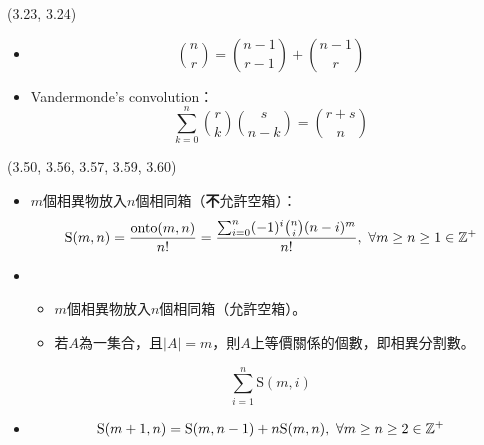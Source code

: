 \item \begin{theorem}{(3.23, 3.24)} \quad\quad
    \begin{itemize}
        \item \begin{equation}
            \binom{n}{r}  = \binom{n - 1}{r - 1} + \binom{n - 1}{r}   
        \end{equation}
        \item Vandermonde's convolution：
        \begin{equation}
            \sum_{k = 0}^{n}\binom{r}{k}\binom{s}{n - k} = \binom{r + s}{n}
        \end{equation}
    \end{itemize}
\end{theorem}

\item \begin{theorem}{(3.50, 3.56, 3.57, 3.59, 3.60)} \quad\quad
    \begin{itemize}
        \item $m$個相異物放入$n$個相同箱（\textbf{不}允許空箱）：\begin{equation}
            \text{S}(m, n) = \frac{\text{onto}(m, n)}{n!} = \frac{\sum_{i = 0}^{n}(-1)^i\binom{n}{i}(n - i)^m}{n!}, \ \forall m \ge n \ge 1 \in \mathbb{Z}^+
        \end{equation}
        \item \begin{itemize}
            \item $m$個相異物放入$n$個相同箱（允許空箱）。
            \item 若$A$為一集合，且$|A| = m$，則$A$上等價關係的個數，即相異分割數。
        \end{itemize} \begin{equation}
            \sum_{i = 1}^{n} \text{S}(m, i)
        \end{equation}
        \item \begin{equation}
            \text{S}(m + 1, n) = \text{S}(m, n - 1) + n\text{S}(m, n), \ \forall m \ge n \ge 2 \in \mathbb{Z}^+
        \end{equation}
    \end{itemize}
\end{theorem}
